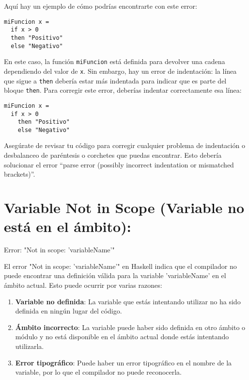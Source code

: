 \documentclass{article}
\begin{document}
Aquí hay un ejemplo de cómo podrías encontrarte con este error:

\begin{verbatim}
miFuncion x = 
  if x > 0
  then "Positivo"
  else "Negativo"
\end{verbatim}

En este caso, la función \texttt{miFuncion} está definida para devolver una cadena dependiendo del valor de \texttt{x}. Sin embargo, hay un error de indentación: la línea que sigue a \texttt{then} debería estar más indentada para indicar que es parte del bloque \texttt{then}. Para corregir este error, deberías indentar correctamente esa línea:

\begin{verbatim}
miFuncion x = 
  if x > 0
    then "Positivo"
    else "Negativo"
\end{verbatim}

Asegúrate de revisar tu código para corregir cualquier problema de indentación o desbalanceo de paréntesis o corchetes que puedas encontrar. Esto debería solucionar el error ``parse error (possibly incorrect indentation or mismatched brackets)''.

\newpage
\section{Variable Not in Scope (Variable no está en el ámbito):}

\begin{mdframed}[backgroundcolor=red!40,shadow=true,shadowsize=2pt,roundcorner=2pt]
    Error: "Not in scope: 'variableName'"
\end{mdframed}

El error "Not in scope: 'variableName'" en Haskell indica que el compilador no puede encontrar una definición válida para la variable 'variableName' en el ámbito actual. Esto puede ocurrir por varias razones:

\begin{enumerate}
    \item \textbf{Variable no definida}: La variable que estás intentando utilizar no ha sido definida en ningún lugar del código.
    
    \item \textbf{Ámbito incorrecto}: La variable puede haber sido definida en otro ámbito o módulo y no está disponible en el ámbito actual donde estás intentando utilizarla.
    
    \item \textbf{Error tipográfico}: Puede haber un error tipográfico en el nombre de la variable, por lo que el compilador no puede reconocerla.
\end{enumerate}
\end{document}
